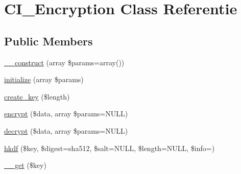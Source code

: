 \hypertarget{class_c_i___encryption}{}\section{C\+I\+\_\+\+Encryption Class Referentie}
\label{class_c_i___encryption}
\subsection*{Public Members}
\begin{DoxyCompactItemize}
\item 
\mbox{\hyperlink{class_c_i___encryption_a85ac5b7f54ad67ec6b5b9dc282717602}{\+\_\+\+\_\+construct}} (array \$params=array())
\item 
\mbox{\hyperlink{class_c_i___encryption_ada6f73e99259423863fe312baa4dad10}{initialize}} (array \$params)
\item 
\mbox{\hyperlink{class_c_i___encryption_a153c5db947db0e572680ed82519cf27e}{create\+\_\+key}} (\$length)
\item 
\mbox{\hyperlink{class_c_i___encryption_a4b260dc7f6a9470e3e95ceeceadb2c86}{encrypt}} (\$data, array \$params=N\+U\+LL)
\item 
\mbox{\hyperlink{class_c_i___encryption_a5f379806ec38a79a6be1dc350b07699a}{decrypt}} (\$data, array \$params=N\+U\+LL)
\item 
\mbox{\hyperlink{class_c_i___encryption_a83e2ca4fadcb78629f036ac23b7a5fd9}{hkdf}} (\$key, \$digest=\textquotesingle{}sha512\textquotesingle{}, \$salt=N\+U\+LL, \$length=N\+U\+LL, \$info=\textquotesingle{}\textquotesingle{})
\item 
\mbox{\hyperlink{class_c_i___encryption_a4537dad3b44254124991341cc91b28fb}{\+\_\+\+\_\+get}} (\$key)
\end{DoxyCompactItemize}
